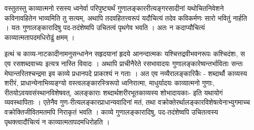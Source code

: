वस्तुतस्तु काव्यात्मनो रसस्य ध्वनेर्वा परिपुष्ट्यर्थं गुणालङ्काररीत्यङ्गरसादीनां यथोचितनिवेशने कविनावहितेन भाव्यमिति तु सत्यम्, अथापि तदवहितत्त्वरूपं यदौचित्यं तदेव कविकर्मणः सारो भवितुं नार्हति । यतः गुणालङ्कारादिषु पद-तदंशेष्वपि उचितत्वं पृथगेव भवति । अतः न कदाप्यौचित्यं काव्यात्मतापदमधिरोढुं क्षमम् ।

इत्थं च काव्य-नाटकादीनामनुसन्धानेन सहृदयानां हृदये आनन्दात्मकः यश्चित्तद्रवीभवनरूपः कश्चिदंशः, स एव रसशब्दवाच्यः इत्यत्र नास्ति विवादः । अथापि प्राचीनैरेते  रसभावादयः गुणालङ्कारेष्वन्तर्भाविताः सन्तः मेघान्तरितश्चन्द्रमा  इव काव्ये प्रधानपदे प्राकाश्यं न गताः । अत एव नव्यैरालङ्कारिकैः  - शब्दार्थौ काव्यस्य शरीरं, प्राधान्येनाभिव्यङ्ग्यो वस्त्वलङ्कारस्त्रिरूपो ध्वनिरात्मा, माधुर्यादयः काव्यात्मनो गुणाः, रीतयोऽवयवसंस्थानविशेषवत्, अलङ्काराः शब्दार्थशरीरभूतकाव्यस्य शोभादायकाः- इति यथायोगं व्यवस्थापिताः । एतेनैव गुण-रीत्यलङ्कारप्राधान्यवादिनां मतं, तथा वक्रोक्तेरर्थालङ्कारविशेषत्वेनाभ्युगमाच्च वक्रोक्तिजीवितमतमपि निराकृतं भवति । काव्ये गुणालङ्कारादिषु, पद-तदंशेष्वपि उचितत्वस्य पृथक्त्वादौचित्यं न काव्यात्मतापदमधिरोहति ।

\articleend
